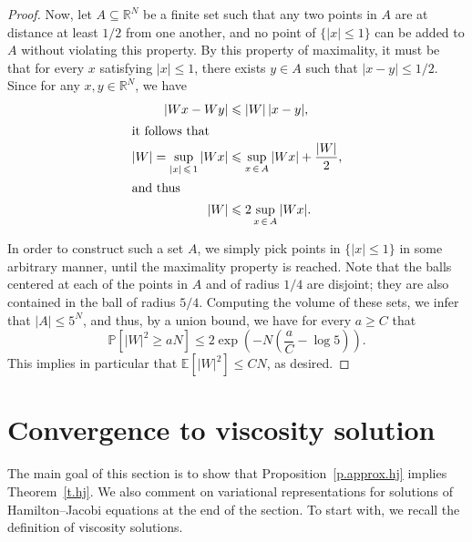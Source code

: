 \documentclass[10pt]{amsart}
\theoremstyle{definition}\newtheorem{defi}[theo]{Definition}\newtheorem{rema}[theo]{Remark}\newtheorem{exam}[theo]{Example}\newtheorem{exem}[theo]{Example}\newtheorem{nota}[theo]{Notation}
\newcommand{\R}{\mathbb{R}}
\newcommand{\E}{\mathbb{E}}
\renewcommand{\P}{\mathbb{P}}
\newcommand{\1}{\mathds{1}}
\renewcommand{\le}{\leqslant}
\renewcommand{\ge}{\geqslant}
\renewcommand{\subset}{\subseteq}
\begin{document}
\begin{proof}
Now, let $A \subset \R^N$ be a finite set such that any two points in $A$ are at distance at least $1/2$ from one another, and no point of $\{|x|\le 1\}$ can be added to $A$ without violating this property. By this property of maximality, it must be that for every $x$ satisfying $|x|\le 1$, there exists $y \in A$ such that $|x-y|\le 1/2$. Since for any $x,y \in \R^N$, we have
\begin{align*}
\left|Wx - Wy\right| &\le |W| \, |x-y|,
\\
\intertext{it follows that}
|W| = \sup_{|x|\,\le\,1} |Wx| &\le \sup_{x\,\in\,A} |Wx| + \frac{|W|}{2},
\\
\intertext{and thus}
|W| &\le 2 \sup_{x\,\in\,A} |Wx|.
\end{align*}

In order to construct such a set $A$, we simply pick points in $\{|x|\le 1\}$ in some arbitrary manner, until the maximality property is reached. Note that the balls centered at each of the points in $A$ and of radius $1/4$ are disjoint; they are also contained in the ball of radius $5/4$. Computing the volume of these sets, we infer that $|A| \le 5^N$, and thus, by a union bound, we have for every $a \ge C$ that
\[
\P \left[|W|^2 \ge aN \right] \le 2 \exp \left(-N \left(\frac a C - \log 5 \right) \right).
\]
This implies in particular that $\E [|W|^2 ] \le C N$, as desired.
\end{proof}

\section{Convergence to viscosity solution}\label{s.convergence}
The main goal of this section is to show that Proposition~\ref{p.approx.hj} implies Theorem~\ref{t.hj}. We also comment on variational representations for solutions of Hamilton--Jacobi equations at the end of the section. To start with, we recall the definition of viscosity solutions.
\end{document}
